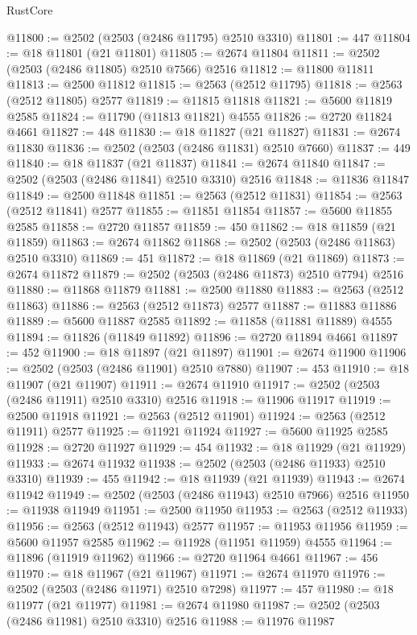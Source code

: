 \begin{lexlean}{RustCore}
\begin{coremodule}
@11800 := @2502 (@2503 (@2486 @11795) @2510 @3310)
@11801 := 447
@11804 := @18 @11801 (@21 @11801)
@11805 := @2674 @11804
@11811 := @2502 (@2503 (@2486 @11805) @2510 @7566) @2516
@11812 := @11800 @11811
@11813 := @2500 @11812
@11815 := @2563 (@2512 @11795)
@11818 := @2563 (@2512 @11805) @2577
@11819 := @11815 @11818
@11821 := @5600 @11819 @2585
@11824 := @11790 (@11813 @11821) @4555
@11826 := @2720 @11824 @4661
@11827 := 448
@11830 := @18 @11827 (@21 @11827)
@11831 := @2674 @11830
@11836 := @2502 (@2503 (@2486 @11831) @2510 @7660)
@11837 := 449
@11840 := @18 @11837 (@21 @11837)
@11841 := @2674 @11840
@11847 := @2502 (@2503 (@2486 @11841) @2510 @3310) @2516
@11848 := @11836 @11847
@11849 := @2500 @11848
@11851 := @2563 (@2512 @11831)
@11854 := @2563 (@2512 @11841) @2577
@11855 := @11851 @11854
@11857 := @5600 @11855 @2585
@11858 := @2720 @11857
@11859 := 450
@11862 := @18 @11859 (@21 @11859)
@11863 := @2674 @11862
@11868 := @2502 (@2503 (@2486 @11863) @2510 @3310)
@11869 := 451
@11872 := @18 @11869 (@21 @11869)
@11873 := @2674 @11872
@11879 := @2502 (@2503 (@2486 @11873) @2510 @7794) @2516
@11880 := @11868 @11879
@11881 := @2500 @11880
@11883 := @2563 (@2512 @11863)
@11886 := @2563 (@2512 @11873) @2577
@11887 := @11883 @11886
@11889 := @5600 @11887 @2585
@11892 := @11858 (@11881 @11889) @4555
@11894 := @11826 (@11849 @11892)
@11896 := @2720 @11894 @4661
@11897 := 452
@11900 := @18 @11897 (@21 @11897)
@11901 := @2674 @11900
@11906 := @2502 (@2503 (@2486 @11901) @2510 @7880)
@11907 := 453
@11910 := @18 @11907 (@21 @11907)
@11911 := @2674 @11910
@11917 := @2502 (@2503 (@2486 @11911) @2510 @3310) @2516
@11918 := @11906 @11917
@11919 := @2500 @11918
@11921 := @2563 (@2512 @11901)
@11924 := @2563 (@2512 @11911) @2577
@11925 := @11921 @11924
@11927 := @5600 @11925 @2585
@11928 := @2720 @11927
@11929 := 454
@11932 := @18 @11929 (@21 @11929)
@11933 := @2674 @11932
@11938 := @2502 (@2503 (@2486 @11933) @2510 @3310)
@11939 := 455
@11942 := @18 @11939 (@21 @11939)
@11943 := @2674 @11942
@11949 := @2502 (@2503 (@2486 @11943) @2510 @7966) @2516
@11950 := @11938 @11949
@11951 := @2500 @11950
@11953 := @2563 (@2512 @11933)
@11956 := @2563 (@2512 @11943) @2577
@11957 := @11953 @11956
@11959 := @5600 @11957 @2585
@11962 := @11928 (@11951 @11959) @4555
@11964 := @11896 (@11919 @11962)
@11966 := @2720 @11964 @4661
@11967 := 456
@11970 := @18 @11967 (@21 @11967)
@11971 := @2674 @11970
@11976 := @2502 (@2503 (@2486 @11971) @2510 @7298)
@11977 := 457
@11980 := @18 @11977 (@21 @11977)
@11981 := @2674 @11980
@11987 := @2502 (@2503 (@2486 @11981) @2510 @3310) @2516
@11988 := @11976 @11987

\end{coremodule}
\end{lexlean}
